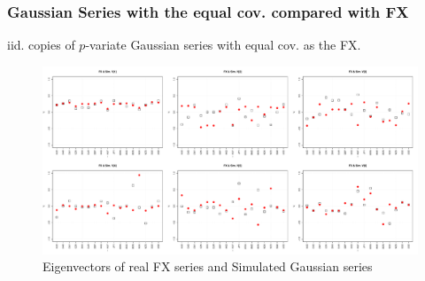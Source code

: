 \documentclass{beamer}
\begin{document}
\begin{frame}
  \frametitle{Gaussian Series with the equal cov. compared with FX}
  iid. copies of $p$-variate Gaussian series with equal cov. as the FX.
  \begin{figure}[htb!]
    \centering
    \includegraphics[width=1.0\linewidth]{Gaussian_eigenvectors.pdf}
    \caption{\scriptsize Eigenvectors of real FX series and Simulated Gaussian series}
  \end{figure}
\end{frame}
\end{document}
